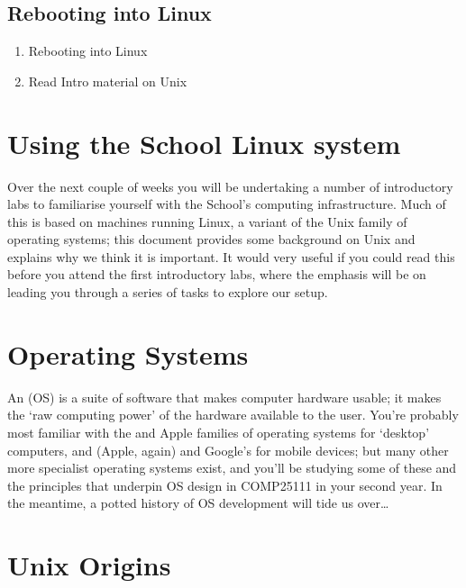 \subsection{Rebooting into Linux}
\label{sec:rebooting-into-linux}
  \begin{enumerate}
  \item Rebooting into Linux
  \item Read Intro material on Unix
  \end{enumerate}


\section{Using the School Linux system}

Over the next couple of weeks you will be undertaking a number of introductory labs to familiarise yourself with the School's computing infrastructure. Much of this is based on machines running Linux, a variant of the Unix family of operating systems; this document provides some background on Unix and explains why we think it is important. It would very useful if you could read this before you attend the first introductory labs, where the emphasis will be on leading you through a series of tasks to explore our setup.

\section{Operating Systems}

An  (OS) is a suite of software that makes
computer hardware usable; it makes the `raw computing power' of the
hardware available to the user. You're probably most familiar with the  and Apple  families of operating systems for `desktop' computers, and  (Apple, again) and Google's  for mobile devices; but many other more specialist operating systems exist, and you'll be studying some of these and the principles that underpin OS design in COMP25111 in your second year. In the meantime, a potted history of OS development will tide us over\ldots
 
\section{Unix Origins}
\label{sec:unix}


